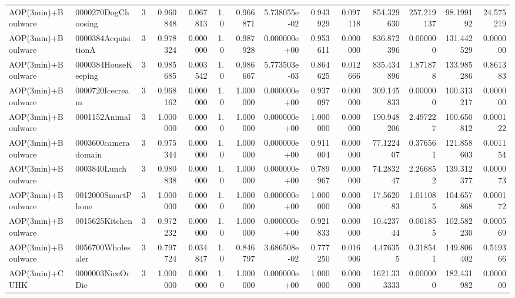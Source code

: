 \begin{tabular}{llrr|r|rr|rr|rr|rrr}
       AOP(3min)+Boulware &     0000270DogChoosing &       3 & 0.960848 & 0.067813 &  1.0 &      0.966871 & 5.738055e-02 &      0.943929 & 0.097118 &    854.329630 &  257.219137 &    98.199192 &   24.575219 \\
       AOP(3min)+Boulware &    0000384AcquisitionA &       3 & 0.978324 & 0.000000 &  1.0 &      0.987928 & 0.000000e+00 &      0.953611 & 0.000000 &    836.872396 &    0.000000 &   131.442529 &    0.000000 \\
       AOP(3min)+Boulware &    0000384HouseKeeping &       3 & 0.985685 & 0.003542 &  1.0 &      0.986667 & 5.773503e-03 &      0.864625 & 0.012666 &    835.434896 &    1.871878 &   133.985286 &    0.861383 \\
       AOP(3min)+Boulware &        0000720Icecream &       3 & 0.968162 & 0.000000 &  1.0 &      1.000000 & 0.000000e+00 &      0.937097 & 0.000000 &    309.145833 &    0.000000 &   100.313217 &    0.000000 \\
       AOP(3min)+Boulware &          0001152Animal &       3 & 1.000000 & 0.000000 &  1.0 &      1.000000 & 0.000000e+00 &      1.000000 & 0.000000 &    190.948206 &    2.497227 &   100.650812 &    0.000122 \\
       AOP(3min)+Boulware &    0003600cameradomain &       3 & 0.975344 & 0.000000 &  1.0 &      1.000000 & 0.000000e+00 &      0.911004 & 0.000000 &     77.122407 &    0.376561 &   121.858603 &    0.001154 \\
       AOP(3min)+Boulware &           0003840Lunch &       3 & 0.980838 & 0.000000 &  1.0 &      1.000000 & 0.000000e+00 &      0.789967 & 0.000000 &     74.283247 &    2.266852 &   139.312377 &    0.000073 \\
       AOP(3min)+Boulware &      0012000SmartPhone &       3 & 1.000000 & 0.000000 &  1.0 &      1.000000 & 0.000000e+00 &      1.000000 & 0.000000 &     17.562083 &    1.011085 &   104.657868 &    0.000172 \\
       AOP(3min)+Boulware &         0015625Kitchen &       3 & 0.972232 & 0.000000 &  1.0 &      1.000000 & 0.000000e+00 &      0.921833 & 0.000000 &     10.423744 &    0.061855 &   102.582230 &    0.000569 \\
       AOP(3min)+Boulware &      0056700Wholesaler &       3 & 0.797724 & 0.034847 &  1.0 &      0.846797 & 3.686508e-02 &      0.777250 & 0.016906 &      4.476355 &    0.318541 &   149.806402 &    0.519366 \\
           AOP(3min)+CUHK &       0000003NiceOrDie &       3 & 1.000000 & 0.000000 &  1.0 &      1.000000 & 0.000000e+00 &      1.000000 & 0.000000 &   1621.333333 &    0.000000 &   182.431982 &    0.000000 \\

\end{tabular}
